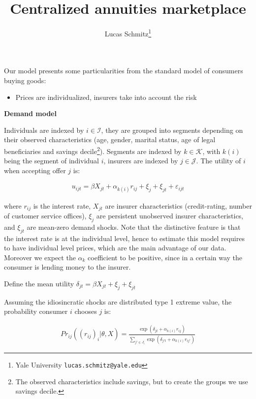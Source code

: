 \documentclass[12pt]{article}
\theoremstyle{plain}
\theoremstyle{plain}
\begin{document}
 

\newpage
 \title{{\Large Centralized annuities marketplace}}
\author{Lucas Schmitz\thanks{Yale University \texttt{lucas.schmitz@yale.edu}}} 
\date{}


\vspace{-1cm}


Our model presents some particularities from the standard model of consumers buying goods:
\begin{itemize}
    \item Prices are individualized, insurers take into account the  risk
\end{itemize}

\textbf{Demand model}
 
Individuals are indexed by $i\in \mathcal{I}$, they are grouped into segments depending on their observed characteristics (age, gender, marital status, age of legal beneficiaries and savings decile\footnote{The observed characteristics include savings, but to create the groups we use savings decile.}). Segments are indexed by $k \in \mathcal{K}$, with $k(i)$ being the segment of individual $i$, insurers are indexed by $j\in \mathcal{J}$.  The utility of $i$ when accepting offer $j$ is: 

\begin{align*}\label{eq:utility}
   u_{ijt} = \beta X_{jt}+ \alpha_{k(i)} r_{ij} + \xi_j +\xi_{jt} + \varepsilon_{ijt}   
\end{align*}

where $r_{ij}$ is the interest rate, $X_{jt}$  are insurer characteristics (credit-rating, number of customer service offices), $\xi_j$ are persistent unobserved insurer characteristics, and  $\xi_{jt}$ are mean-zero demand shocks.  
Note that the distinctive feature is that the interest rate is at the individual level, hence to estimate this model requires to have individual level prices, which are the main advantage of our data. Moreover we expect the $\alpha_k$ coefficient to be positive, since in a certain way the consumer is lending money to the insurer. 

Define the mean utility $\delta_{jt} = \beta X_{jt} + \xi_j + \xi_{jt}$

Assuming the idiosincratic shocks are distributed type 1 extreme value, the probability consumer $i$ chooses $j$ is: 

\begin{align*}
    Pr_{ij}((r_{ij})_{i}|\theta, X) = \frac{\exp(\delta_{jt} + \alpha_{k(i)}r_{ij})}{\sum_{j'\in J_i}\exp(\delta_{j't} + \alpha_{k(i)}r_{ij'})}
\end{align*}
\end{document}
